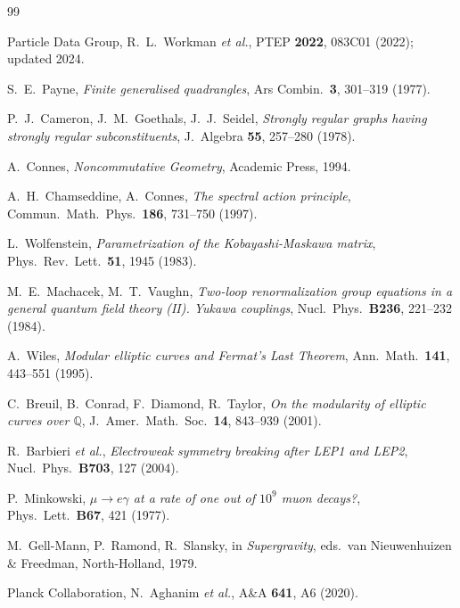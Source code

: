 \documentclass[12pt,a4paper]{article}
\begin{document}
\begin{thebibliography}{99}

 Particle Data Group, R.~L.~Workman \textit{et al.},
  PTEP \textbf{2022}, 083C01 (2022); updated 2024.

 S.~E.~Payne, \textit{Finite generalised quadrangles},
  Ars Combin.\ \textbf{3}, 301--319 (1977).

 P.~J.~Cameron, J.~M.~Goethals, J.~J.~Seidel,
  \textit{Strongly regular graphs having strongly regular subconstituents},
  J.~Algebra \textbf{55}, 257--280 (1978).

 A.~Connes,
  \textit{Noncommutative Geometry},
  Academic Press, 1994.

 A.~H.~Chamseddine, A.~Connes,
  \textit{The spectral action principle},
  Commun.~Math.~Phys.\ \textbf{186}, 731--750 (1997).

 L.~Wolfenstein,
  \textit{Parametrization of the Kobayashi-Maskawa matrix},
  Phys.~Rev.~Lett.\ \textbf{51}, 1945 (1983).

 M.~E.~Machacek, M.~T.~Vaughn,
  \textit{Two-loop renormalization group equations in a general quantum field
  theory (II). Yukawa couplings},
  Nucl.~Phys.\ \textbf{B236}, 221--232 (1984).

 A.~Wiles,
  \textit{Modular elliptic curves and Fermat's Last Theorem},
  Ann.~Math.\ \textbf{141}, 443--551 (1995).

 C.~Breuil, B.~Conrad, F.~Diamond, R.~Taylor,
  \textit{On the modularity of elliptic curves over $\mathbb{Q}$},
  J.~Amer.~Math.~Soc.\ \textbf{14}, 843--939 (2001).

 R.~Barbieri \textit{et al.},
  \textit{Electroweak symmetry breaking after LEP1 and LEP2},
  Nucl.~Phys.\ \textbf{B703}, 127 (2004).

 P.~Minkowski,
  \textit{$\mu\to e\gamma$ at a rate of one out of $10^9$ muon decays?},
  Phys.~Lett.\ \textbf{B67}, 421 (1977).

 M.~Gell-Mann, P.~Ramond, R.~Slansky, in
  \textit{Supergravity}, eds.\ van Nieuwenhuizen \& Freedman, North-Holland, 1979.

 Planck Collaboration, N.~Aghanim \textit{et al.},
  A\&A \textbf{641}, A6 (2020).


\end{thebibliography}
\end{document}
